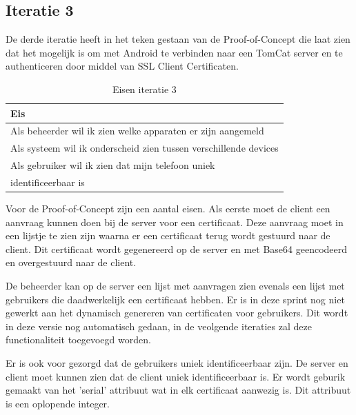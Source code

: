 \documentclass[]{article}
\begin{document}
\subsection{Iteratie 3}
De derde iteratie heeft in het teken gestaan van de Proof-of-Concept die laat zien
dat het mogelijk is om met Android te verbinden naar een TomCat server en
te authenticeren door middel van SSL Client Certificaten.

\begin{table}[htpb]
  \caption{Eisen iteratie 3}
  \begin{center}
    \begin{tabular}{|| l ||}\hline
        Eis                                                              \\\hline\hline
        Als beheerder wil ik zien welke apparaten er zijn aangemeld      \\\hline
        Als systeem wil ik onderscheid zien tussen verschillende devices \\\hline
        Als gebruiker wil ik zien dat mijn telefoon uniek                \\ 
        identificeerbaar is                                              \\\hline
    \end{tabular}                                                         
  \end{center}                                                            
\end{table}                                                               

Voor de Proof-of-Concept zijn een aantal eisen. Als eerste moet de client
een aanvraag kunnen doen bij de server voor een certificaat. Deze aanvraag
moet in een lijstje te zien zijn waarna er een certificaat terug wordt
gestuurd naar de client. Dit certificaat wordt gegenereerd op de server en
met Base64 geencodeerd en overgestuurd naar de client.

De beheerder kan op de server een lijst met aanvragen zien evenals een
lijst met gebruikers die daadwerkelijk een certificaat hebben. Er is in deze
sprint nog niet gewerkt aan het dynamisch genereren van certificaten voor
gebruikers. Dit wordt in deze versie nog automatisch gedaan, in de veolgende
iteraties zal deze functionaliteit toegevoegd worden.

Er is ook voor gezorgd dat de gebruikers uniek identificeerbaar zijn. De server
en client moet kunnen zien dat de client uniek identificeerbaar is. Er wordt
geburik gemaakt van het 'serial' attribuut wat in elk certificaat aanwezig is.
Dit attribuut is een oplopende integer.
\end{document}
